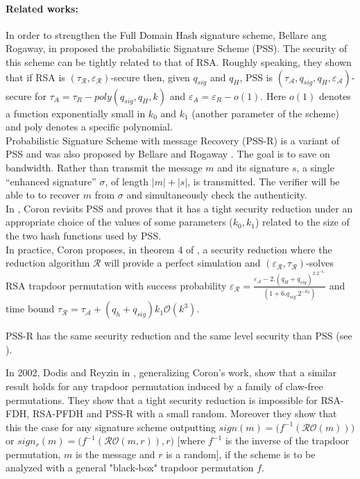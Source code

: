 \documentclass[a4paper,11pt]{article}
\begin{document}
\paragraph{Related works:}
In order to strengthen the Full Domain Hash signature scheme, Bellare ang Rogaway, in \cite{Bellare2} proposed the probabilistic Signature Scheme (PSS). The security of this scheme can be tightly related to that of RSA. Roughly speaking, they shown that if RSA is $(\tau_\mathcal{R},\varepsilon_\mathcal{R})$-secure then, given $q_{sig}$ and $q_H$, PSS is $(\tau_\mathcal{A},q_{sig},q_{H},\varepsilon_\mathcal{A})$-secure for $\tau_{A}=\tau_{R}-poly(q_{sig},q_{H},k)$ and $\varepsilon_{A}=\varepsilon_{R}-o(1)$. Here $o(1)$ denotes a function exponentially small in $k_0$ and $k_1$ (another parameter of the scheme) and poly denotes a specific polynomial.\\
Probabilistic Signature Scheme with message Recovery (PSS-R) is a variant of PSS and was also proposed by Bellare and Rogaway \cite{Bellare2}.  The goal is to save on bandwidth. Rather than transmit the message $m$ and its signature $s$, a single ``enhanced signature'' $\sigma$, of length $|m|+|s|$, is transmitted. The verifier will be able to to recover $m$ from $\sigma$ and simultaneously check the authenticity.\\
In \cite{Coron-GHR-PSS}, Coron revisits PSS and proves that it has a  tight security reduction under an appropriate choice of the values of some parameters ($k_{0}, k_{1}$) related to the size of the two hash functions used by PSS.\\
In practice, Coron proposes, in theorem 4 of \cite{Coron-GHR-PSS}, a security reduction where the reduction algorithm  $\mathcal{R}$ will provide a perfect simulation and $(\varepsilon_{\mathcal{R}}, \tau_{\mathcal{R}})$-solves RSA trapdoor permutation with success probability $\varepsilon_\mathcal{R}=\frac{\varepsilon_\mathcal{A}-2.(q_H+q_{sig})^2.2^{-k_1}}{(1+6.q_{sig}.2^{-k_0})}$ and time bound $\tau_{\mathcal{R}}= \tau_{\mathcal{A}} + (q_{h}+q_{sig})k_{1}\mathcal{O}(k^{3})$. 

PSS-R has the same security reduction and the same level security than PSS (see \cite{Coron-GHR-PSS}).


In 2002, Dodis and Reyzin in \cite{Dodis}, generalizing Coron's work, show that a similar result holds for any trapdoor
 permutation induced by a family of claw-free permutations. They show that a tight security reduction is impossible for RSA-FDH, RSA-PFDH and PSS-R with a small random. Moreover they show that this the case for any signature scheme outputting $sign(m)=\big(f^{-1}(\mathcal{RO}(m))\big)$ or $sign_{r}(m)=\big(f^{-1}(\mathcal{RO}(m, r)), r\big)$ [where $f^{-1}$ is the inverse of the trapdoor permutation, $m$ is the message and $r$ is a random], if the scheme is to be analyzed with a general "black-box" trapdoor permutation $f$.
 
\end{document}
